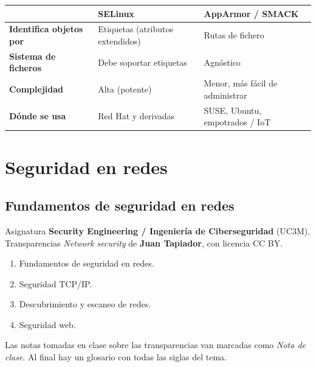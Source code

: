 \documentclass[11pt,a4paper]{report}
\begin{document}
\begin{center}
\small
{\setlength{\aboverulesep}{0pt}\setlength{\belowrulesep}{0pt}\renewcommand{\arraystretch}{1.3}%
\begin{tabularx}{\linewidth}{>{\raggedright\arraybackslash}p{3.2cm} !{\color{gray!45}\vrule width 0.2pt} >{\raggedright\arraybackslash}X !{\color{gray!45}\vrule width 0.2pt} >{\raggedright\arraybackslash}X}
\toprule
 & \textbf{SELinux} & \textbf{AppArmor / SMACK} \\
\midrule
\textbf{Identifica objetos por} & Etiquetas (atributos extendidos) & Rutas de fichero \\
\textbf{Sistema de ficheros} & Debe soportar etiquetas & Agnóstico \\
\textbf{Complejidad} & Alta (potente) & Menor, más fácil de administrar \\
\textbf{Dónde se usa} & Red Hat y derivadas & SUSE, Ubuntu, empotrados / IoT \\
\bottomrule
\end{tabularx}}
\end{center}

\part{Seguridad en redes}
 
\chapter{Fundamentos de seguridad en redes}
 
\begin{importante}[title={Sobre este tema}]
Asignatura \textbf{Security Engineering / Ingeniería de Ciberseguridad} (UC3M). Transparencias \emph{Network security} de \textbf{Juan Tapiador}, con licencia CC BY.
\begin{enumerate}
  \item Fundamentos de seguridad en redes.
  \item Seguridad TCP/IP.
  \item Descubrimiento y escaneo de redes.
  \item Seguridad web.
\end{enumerate}
Las notas tomadas en clase sobre las transparencias van marcadas como \emph{Nota de clase}. Al final hay un glosario con todas las siglas del tema.
\end{importante}
 
\end{document}
